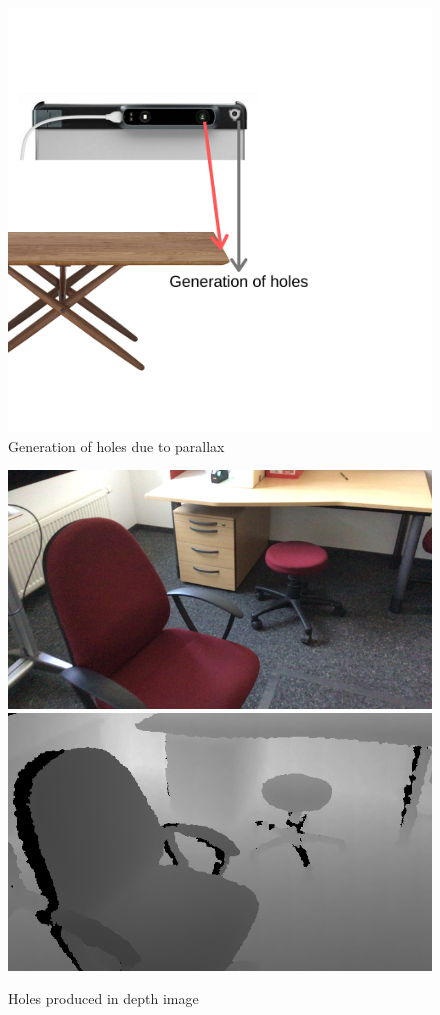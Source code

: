 \begin{figure}[h]
    \centering
    \includegraphics[scale=0.4]{Figures/holes.png}
    \caption{Generation of holes due to parallax}
    \label{fig:holes}
\end{figure}

\begin{figure}[h]
    \includegraphics[scale=0.29]{Figures/RGB.png} \includegraphics[scale=0.37]{Figures/Depth.png}
    \caption{Holes produced in depth image}
    \label{fig:holes2}
\end{figure}


